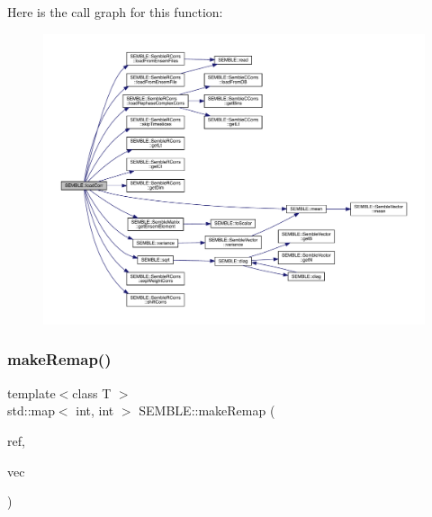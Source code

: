 Here is the call graph for this function\+:
\nopagebreak
\begin{figure}[H]
\begin{center}
\leavevmode
\includegraphics[width=350pt]{d7/dfd/namespaceSEMBLE_ac1cc350e27e1e8e132f8b9af4145950f_cgraph}
\end{center}
\end{figure}
\mbox{\label{namespaceSEMBLE_a7cb9cde2b51fb036476a01f5a37bf15c}} 
\subsubsection{\texorpdfstring{makeRemap()}{makeRemap()}}
{\footnotesize\ttfamily template$<$class T $>$ \\
std\+::map$<$ int, int $>$ S\+E\+M\+B\+L\+E\+::make\+Remap (\begin{DoxyParamCaption}\item[{const \mbox{\hyperlink{structSEMBLE_1_1SembleMatrix}{Semble\+Matrix}}$<$ T $>$ \&}]{ref,  }\item[{const \mbox{\hyperlink{structSEMBLE_1_1SembleMatrix}{Semble\+Matrix}}$<$ T $>$ \&}]{vec }\end{DoxyParamCaption})}

